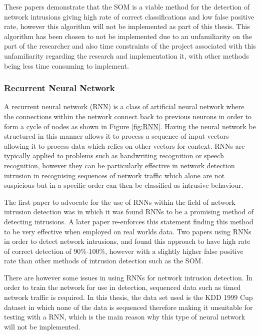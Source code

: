 	These papers demonstrate that the SOM is a viable method for the detection of network intrusions giving high rate of correct classifications and low false positive rate, however this algorithm will not be implemented as part of this thesis. This algorithm has been chosen to not be implemented due to an unfamiliarity on the part of the researcher and also time constraints of the project associated with this unfamiliarity regarding the research and implementation it, with other methods being less time consuming to implement.
	
	\subsubsection{Recurrent Neural Network}
	A recurrent neural network (RNN) is a class of artificial neural network where the connections within the network connect back to previous neurons in order to form a cycle of nodes as shown in Figure \ref{fig:RNN}. Having the neural network be structured in this manner allows it to process a sequence of input vectors allowing it to process data which relies on other vectors for context. RNNs are typically applied to problems such as handwriting recognition or speech recognition, however they can be particularly effective in network detection intrusion in recognising sequences of network traffic which alone are not suspicious but in a specific order can then be classified as intrusive behaviour.

		
	
	The first paper to advocate for the use of RNNs within the field of network intrusion detection was \cite{debar1992application} in which it was found RNNs to be a promising method of detecting intrusions. A later paper \cite{ryan1998intrusion} re-enforces this statement finding this method to be very effective when employed on real worlds data. Two papers using RNNs in order to detect network intrusions, \cite{tong2009research} and \cite{ghosh1999study} found this approach to have high rate of correct detection of 90\%-100\%, however with a slightly higher false positive rate than other methods of intrusion detection such as the SOM. 
	
	There are however some issues in using RNNs for network intrusion detection. In order to train the network for use in detection, sequenced data such as timed network traffic is required. In this thesis, the data set used is the KDD 1999 Cup dataset in which none of the data is sequenced therefore making it unsuitable for testing with a RNN, which is the main reason why this type of neural network will not be implemented.
	
